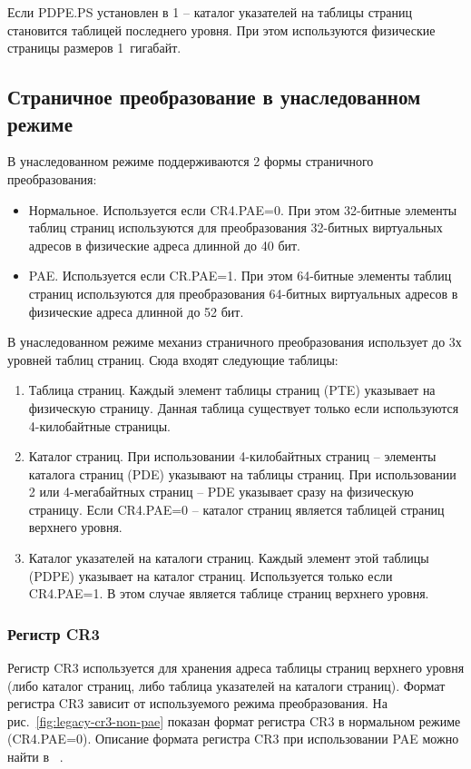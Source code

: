 Если PDPE.PS установлен в 1 -- каталог указателей на таблицы страниц становится таблицей последнего уровня.
При этом используются физические страницы размеров 1~гигабайт.

\subsection{Страничное преобразование в унаследованном режиме}
В унаследованном режиме поддерживаются 2 формы страничного преобразования:
\begin{itemize}
\item Нормальное. Используется если CR4.PAE=0. При этом 32-битные элементы таблиц страниц
	используются для преобразования 32-битных виртуальных адресов в физические адреса длинной до 40 бит.
\item PAE. Используется если CR.PAE=1. При этом 64-битные элементы таблиц страниц используются
	для преобразования 64-битных виртуальных адресов в физические адреса длинной до 52 бит.
\end{itemize}

В унаследованном режиме механиз страничного преобразования использует до 3х уровней таблиц страниц.
Сюда входят следующие таблицы:
\begin{enumerate}[1.]
	\item Таблица страниц. Каждый элемент таблицы страниц (PTE) указывает на физическую страницу. Данная таблица
		существует только если используются 4-килобайтные страницы.
	\item Каталог страниц. При использовании 4-килобайтных страниц -- элементы каталога страниц (PDE)
		указывают на таблицы страниц. При использовании 2 или 4-мегабайтных страниц -- PDE указывает
		сразу на физическую страницу. Если CR4.PAE=0 -- каталог страниц является таблицей страниц верхнего уровня.
	\item Каталог указателей на каталоги страниц. Каждый элемент этой таблицы (PDPE) указывает на каталог страниц.
		Используется только если CR4.PAE=1. В этом случае является таблице страниц верхнего уровня.
\end{enumerate}

\subsubsection*{Регистр CR3}
Регистр CR3 используется для хранения адреса таблицы страниц верхнего уровня (либо каталог страниц,
либо таблица указателей на каталоги страниц). Формат регистра CR3 зависит от используемого режима
преобразования. На рис.~\ref{fig:legacy-cr3-non-pae} показан формат регистра CR3 в нормальном режиме (CR4.PAE=0).
Описание формата регистра CR3 при использовании PAE можно найти в ~\cite{amd_pm_v2}.


